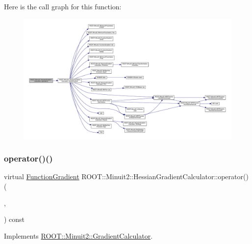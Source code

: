 Here is the call graph for this function\+:\nopagebreak
\begin{figure}[H]
\begin{center}
\leavevmode
\includegraphics[width=350pt]{dc/d17/classROOT_1_1Minuit2_1_1HessianGradientCalculator_ae8832c265494484c65aed77f023b843f_cgraph}
\end{center}
\end{figure}
\mbox{\label{classROOT_1_1Minuit2_1_1HessianGradientCalculator_af6fed0f29a33ec23f97451562d41cfaa}} 
\subsubsection{\texorpdfstring{operator()()}{operator()()}\hspace{0.1cm}{\footnotesize\ttfamily [4/4]}}
{\footnotesize\ttfamily virtual \mbox{\hyperlink{classROOT_1_1Minuit2_1_1FunctionGradient}{Function\+Gradient}} R\+O\+O\+T\+::\+Minuit2\+::\+Hessian\+Gradient\+Calculator\+::operator() (\begin{DoxyParamCaption}\item[{const \mbox{\hyperlink{classROOT_1_1Minuit2_1_1MinimumParameters}{Minimum\+Parameters}} \&}]{,  }\item[{const \mbox{\hyperlink{classROOT_1_1Minuit2_1_1FunctionGradient}{Function\+Gradient}} \&}]{ }\end{DoxyParamCaption}) const\hspace{0.3cm}{\ttfamily [virtual]}}



Implements \mbox{\hyperlink{classROOT_1_1Minuit2_1_1GradientCalculator_a1809c1e8a89d32aabf7835e9690c2916}{R\+O\+O\+T\+::\+Minuit2\+::\+Gradient\+Calculator}}.

